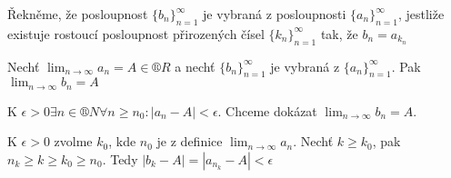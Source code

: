 \documentclass[12pt]{article}					%
\begin{document}
        \begin{definice}
                Řekněme, že posloupnost $\{b_n\}_{n = 1}^∞$ je vybraná z posloupnosti $\{a_n\}_{n = 1}^∞$, jestliže existuje rostoucí posloupnost přirozených čísel $\{k_n\}_{n = 1}^∞$ tak, že $b_n = a_{k_n}$
        \end{definice}

        \begin{veta}
            Nechť $\lim_{n \rightarrow ∞} a_n = A\in ®R$ a nechť $\{b_n\}_{n = 1}^∞$ je vybraná z $\{a_n\}_{n = 1}^∞$. Pak $\lim_{n \rightarrow ∞} b_n = A$
            \begin{dukazin}
                K $\epsilon > 0 \exists n \in ®N \forall n ≥ n_0: |a_n - A|<\epsilon$. Chceme dokázat $\lim_{n \rightarrow ∞} b_n = A$.

                K $\epsilon > 0$ zvolme $k_0$, kde $n_0$ je z definice $\lim_{n \rightarrow ∞}a_n$. Nechť $k≥k_0$, pak $n_k≥k≥k_0≥n_0$. Tedy $|b_k - A| = |a_{n_k}-A|<\epsilon$
            \end{dukazin}
        \end{veta}
\end{document}
